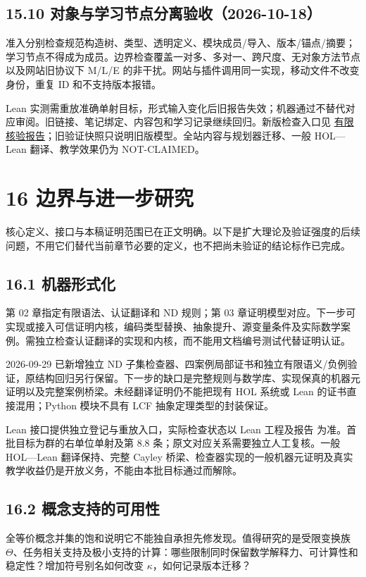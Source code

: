 \documentclass[UTF8,a4paper,zihao=-4,fontset=windows,openany]{ctexbook}
\newcommand{\mcsorigin}[1]{\par\noindent{\small\color{black!55}#1}\par\addvspace{0.8em}}
\begin{document}
\section{15.10 对象与学习节点分离验收（2026-10-18）}
准入分别检查规范构造树、类型、透明定义、模块成员/导入、版本/锚点/摘要；学习节点不得成为成员。边界检查覆盖一对多、多对一、跨尺度、无对象方法节点以及网站旧协议下 M/L/E 的非干扰。网站与插件调用同一实现，移动文件不改变身份，重复 ID 和不支持版本报错。

Lean 实测需重放准确单射目标，形式输入变化后旧报告失效；机器通过不替代对应审阅。旧链接、笔记绑定、内容包和学习记录继续回归。新版检查入口见 \hyperref[mcs-source-28]{有限核验报告}；旧验证快照只说明旧版模型。全站内容与规划器迁移、一般 HOL—Lean 翻译、教学效果仍为 NOT-CLAIMED。

\clearpage\chapter{16 边界与进一步研究}
\label{mcs-source-22}
\mcsorigin{原章节：16-开放问题.md}
核心定义、接口与本稿证明范围已在正文明确。以下是扩大理论及验证强度的后续问题，不用它们替代当前章节必要的定义，也不把尚未验证的结论标作已完成。

\section{16.1 机器形式化}
第 02 章指定有限语法、认证翻译和 ND 规则；第 03 章证明模型对应。下一步可实现或接入可信证明内核，编码类型替换、抽象提升、源变量条件及实际数学案例。需独立检查认证翻译的实现和内核，而不能用文档编号测试代替证明认证。

2026-09-29 已新增独立 ND 子集检查器、四案例局部证书和独立有限语义/负例验证，原结构回归另行保留。下一步的缺口是完整规则与数学库、实现保真的机器元证明以及完整案例桥梁。未经翻译证明仍不能把现有 HOL 系统或 Lean 的证书直接混用；Python 模块不具有 LCF 抽象定理类型的封装保证。

Lean 接口提供独立登记与重放入口，实际检查状态以 Lean 工程及报告 为准。首批目标为群的右单位单射及第 8.8 条；原文对应关系需要独立人工复核。一般 HOL—Lean 翻译保持、完整 Cayley 桥梁、检查器实现的一般机器元证明及真实教学收益仍是开放义务，不能由本批目标通过而解除。

\section{16.2 概念支持的可用性}
全等价概念并集的饱和说明它不能独自承担先修发现。值得研究的是受限变换族 \(\Theta\)、任务相关支持及极小支持的计算：哪些限制同时保留数学解释力、可计算性和稳定性？增加符号别名如何改变 \(\kappa\)，如何记录版本迁移？
\end{document}
